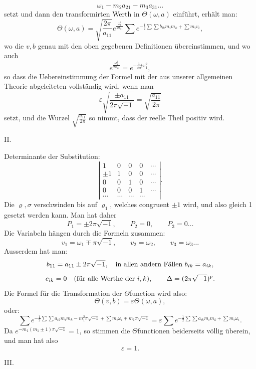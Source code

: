 \documentclass[10pt]{article}
\begin{document}
\[
\omega_1-m_2a_{21}-m_3a_{31}\ldots
\]
setzt und dann den transformirten Werth in \(\Theta(\omega,a)\) einführt, erhält man:
\[
\Theta(\omega,a)=\sqrt{\frac{2\pi}{a_{11}}}e^{\frac{\omega_1^2}{2a_{11}}}\sum e^{-\frac12\sum\sum b_{ik}m_im_k+\sum m_iv_i},
\]
wo die \(v,b\) genau mit den oben gegebenen Definitionen übereinstimmen, und wo auch
\[
e^{\frac{\omega_1^2}{2a_{11}}}=e^{-\frac{a_{11}}{8\pi^2}v_1^2},
\]
so dass die Uebereinstimmung der Formel mit der aus unserer allgemeinen Theorie abgeleiteten vollständig wird, wenn man
\[
\varepsilon\sqrt{\frac{\pm a_{11}}{2\pi\sqrt{-1}}}=\sqrt{\frac{a_{11}}{2\pi}}
\]
setzt, und die Wurzel \(\sqrt{\frac{a_{11}}{2\pi}}\) so nimmt, dass der reelle Theil positiv wird.

\begin{center}II.\end{center}

Determinante der Substitution:
\[
\left|\begin{array}{ccccc}
1&0&0&0&\cdots\\
\pm1&1&0&0&\cdots\\
0&0&1&0&\cdots\\
0&0&0&1&\cdots\\
\cdots&\cdots&\cdots&\cdots&
\end{array}\right|.
\]
Die \(\varrho,\sigma\) verschwinden bis auf \(\varrho_1\), welches congruent \(\pm1\) wird, und also gleich 1 gesetzt werden kann. Man hat daher
\[
P_1=\pm2\pi\sqrt{-1},\qquad P_2=0,
\qquad P_3=0\ldots
\]
Die Variabeln hängen durch die Formeln zusammen:
\[
v_1=\omega_1\mp\pi\sqrt{-1},\qquad
v_2=\omega_2,
\qquad v_3=\omega_3\ldots
\]
Ausserdem hat man:
\[
b_{11}=a_{11}\pm2\pi\sqrt{-1},\quad
\hbox{in allen andern Fällen }b_{ik}=a_{ik},
\]
\[
c_{ik}=0\quad(\hbox{für alle Werthe der }i,k),
\qquad\Delta=(2\pi\sqrt{-1})^p.
\]
Die Formel für die Transformation der \(\Theta\)function wird also:
\[
\Theta(v,b)=\varepsilon\Theta(\omega,a),
\]
oder:
\[
\sum e^{-\frac12\sum\sum a_{ik}m_im_k-m_1^2\pi\sqrt{-1}+\sum m_i\omega_i\mp m_1\pi\sqrt{-1}}
=\varepsilon\sum e^{-\frac12\sum\sum a_{ik}m_im_k+\sum m_i\omega_i}.
\]
Da \(e^{-m_1(m_1\pm1)\pi\sqrt{-1}}=1\), so stimmen die \(\Theta\)functionen beiderseits völlig überein, und man hat also
\[
\varepsilon=1.
\]

\begin{center}III.\end{center}
\end{document}
